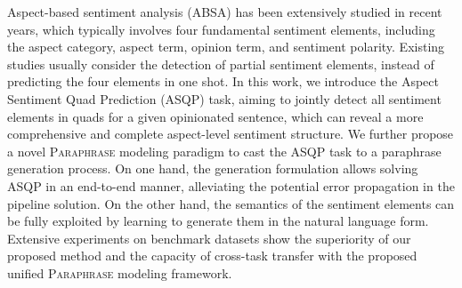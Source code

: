 Aspect-based sentiment analysis (ABSA) has been extensively studied in recent years, which typically involves four fundamental sentiment elements, including the aspect category, aspect term, opinion term, and sentiment polarity. Existing studies usually consider the detection of partial sentiment elements, instead of predicting the four elements in one shot. In this work, we introduce the Aspect Sentiment Quad Prediction (ASQP) task, aiming to jointly detect all sentiment elements in quads for a given opinionated sentence, which can reveal a more comprehensive and complete aspect-level sentiment structure. We further propose a novel \textsc{Paraphrase} modeling paradigm to cast the ASQP task to a paraphrase generation process. On one hand, the generation formulation allows solving ASQP in an end-to-end manner, alleviating the potential error propagation in the pipeline solution. On the other hand, the semantics of the sentiment elements can be fully exploited by learning to generate them in the natural language form. Extensive experiments on benchmark datasets show the superiority of our proposed method and the capacity of cross-task transfer with the proposed unified \textsc{Paraphrase} modeling framework.
